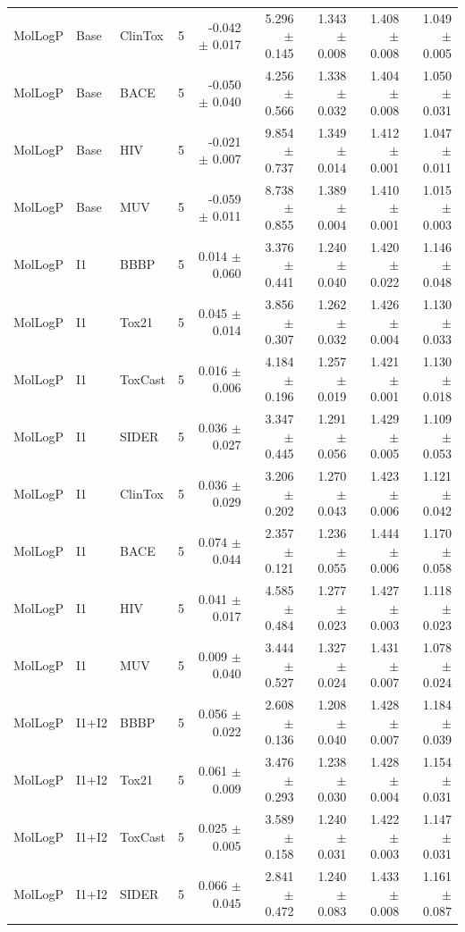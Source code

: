 \documentclass[journal=jcisd8,manuscript=article]{achemso}
\newcommand{\MolLogP}{MolLogP}
\begin{document}
\begin{landscape}
\begin{longtable}{lllrrrrrr}
\MolLogP & Base & ClinTox & 5 & -0.042 $\pm$ 0.017 & 5.296 $\pm$ 0.145 & 1.343 $\pm$ 0.008 & 1.408 $\pm$ 0.008 & 1.049 $\pm$ 0.005 \\
\MolLogP & Base & BACE & 5 & -0.050 $\pm$ 0.040 & 4.256 $\pm$ 0.566 & 1.338 $\pm$ 0.032 & 1.404 $\pm$ 0.008 & 1.050 $\pm$ 0.031 \\
\MolLogP & Base & HIV & 5 & -0.021 $\pm$ 0.007 & 9.854 $\pm$ 0.737 & 1.349 $\pm$ 0.014 & 1.412 $\pm$ 0.001 & 1.047 $\pm$ 0.011 \\
\MolLogP & Base & MUV & 5 & -0.059 $\pm$ 0.011 & 8.738 $\pm$ 0.855 & 1.389 $\pm$ 0.004 & 1.410 $\pm$ 0.001 & 1.015 $\pm$ 0.003 \\
\MolLogP & I1 & BBBP & 5 & 0.014 $\pm$ 0.060 & 3.376 $\pm$ 0.441 & 1.240 $\pm$ 0.040 & 1.420 $\pm$ 0.022 & 1.146 $\pm$ 0.048 \\
\MolLogP & I1 & Tox21 & 5 & 0.045 $\pm$ 0.014 & 3.856 $\pm$ 0.307 & 1.262 $\pm$ 0.032 & 1.426 $\pm$ 0.004 & 1.130 $\pm$ 0.033 \\
\MolLogP & I1 & ToxCast & 5 & 0.016 $\pm$ 0.006 & 4.184 $\pm$ 0.196 & 1.257 $\pm$ 0.019 & 1.421 $\pm$ 0.001 & 1.130 $\pm$ 0.018 \\
\MolLogP & I1 & SIDER & 5 & 0.036 $\pm$ 0.027 & 3.347 $\pm$ 0.445 & 1.291 $\pm$ 0.056 & 1.429 $\pm$ 0.005 & 1.109 $\pm$ 0.053 \\
\MolLogP & I1 & ClinTox & 5 & 0.036 $\pm$ 0.029 & 3.206 $\pm$ 0.202 & 1.270 $\pm$ 0.043 & 1.423 $\pm$ 0.006 & 1.121 $\pm$ 0.042 \\
\MolLogP & I1 & BACE & 5 & 0.074 $\pm$ 0.044 & 2.357 $\pm$ 0.121 & 1.236 $\pm$ 0.055 & 1.444 $\pm$ 0.006 & 1.170 $\pm$ 0.058 \\
\MolLogP & I1 & HIV & 5 & 0.041 $\pm$ 0.017 & 4.585 $\pm$ 0.484 & 1.277 $\pm$ 0.023 & 1.427 $\pm$ 0.003 & 1.118 $\pm$ 0.023 \\
\MolLogP & I1 & MUV & 5 & 0.009 $\pm$ 0.040 & 3.444 $\pm$ 0.527 & 1.327 $\pm$ 0.024 & 1.431 $\pm$ 0.007 & 1.078 $\pm$ 0.024 \\
\MolLogP & I1+I2 & BBBP & 5 & 0.056 $\pm$ 0.022 & 2.608 $\pm$ 0.136 & 1.208 $\pm$ 0.040 & 1.428 $\pm$ 0.007 & 1.184 $\pm$ 0.039 \\
\MolLogP & I1+I2 & Tox21 & 5 & 0.061 $\pm$ 0.009 & 3.476 $\pm$ 0.293 & 1.238 $\pm$ 0.030 & 1.428 $\pm$ 0.004 & 1.154 $\pm$ 0.031 \\
\MolLogP & I1+I2 & ToxCast & 5 & 0.025 $\pm$ 0.005 & 3.589 $\pm$ 0.158 & 1.240 $\pm$ 0.031 & 1.422 $\pm$ 0.003 & 1.147 $\pm$ 0.031 \\
\MolLogP & I1+I2 & SIDER & 5 & 0.066 $\pm$ 0.045 & 2.841 $\pm$ 0.472 & 1.240 $\pm$ 0.083 & 1.433 $\pm$ 0.008 & 1.161 $\pm$ 0.087 \\

\end{longtable}
\end{landscape}
\end{document}
